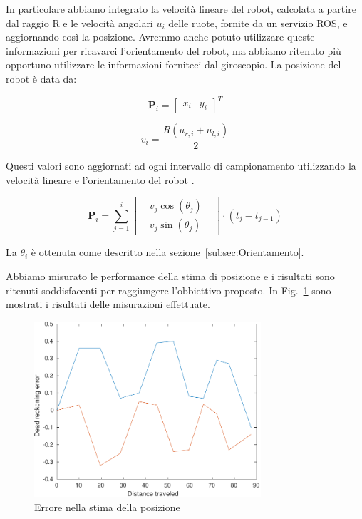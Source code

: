 \documentclass[a4paper]{article}
\begin{document}
	In particolare abbiamo integrato la velocità lineare del robot, calcolata a
	partire dal raggio R e le velocità angolari $u_i$ delle ruote, fornite da
	un servizio ROS, e aggiornando così la posizione. Avremmo anche potuto
	utilizzare queste informazioni per ricavarci l'orientamento del robot, ma
	abbiamo ritenuto più opportuno utilizzare le informazioni forniteci dal
	giroscopio. La posizione del robot è data da:
	
	\begin{equation}\label{eq:position-vector}
		\textbf{P}_i = \begin{bmatrix}
			  x_i & y_i  
		\end{bmatrix}^T
	\end{equation}
	
	\begin{equation}\label{eq:linear-velocity}
		v_i = \frac{R (u_{r,i}+u_{l,i})}{2}
	\end{equation}
	
	Questi valori sono aggiornati ad ogni intervallo di campionamento
	utilizzando la velocità lineare e l'orientamento del robot \cite{572228}.
	
	\begin{equation}\label{eq:position-vector-update}
		\textbf{P}_i = \sum_{j = 1}^{i} \begin{bmatrix}
			 & v_j\cos(\theta_j ) & \\
			 & v_j\sin(\theta_j )
		\end{bmatrix}\cdot (t_j-t_{j-1}) 
	\end{equation}

	La $\theta_i$ è ottenuta come descritto nella sezione~\ref{subsec:Orientamento}.
	
	Abbiamo misurato le performance della stima di posizione e i risultati sono ritenuti soddisfacenti per raggiungere l'obbiettivo proposto. In Fig.~\ref{fig:dead_reckoning_error} sono mostrati i risultati delle misurazioni effettuate.
	
	\begin{figure}[H]
		\centering
		\includegraphics[width=0.75\textwidth]{./img/dead_reckoning_error.pdf}
		\caption{Errore nella stima della posizione}
		\label{fig:dead_reckoning_error}
	\end{figure}
\end{document}
